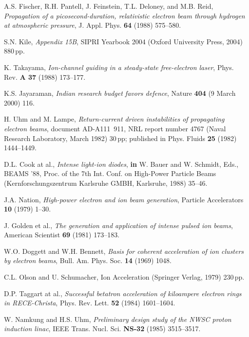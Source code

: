 \documentclass [12pt,a4paper,     ]{report} %
\begin{document}
\begin{enumerate}
 A.S. Fischer, R.H. Pantell, J. Feinstein, T.L. Deloney, and M.B. Reid, \emph{Propagation of a picosecond-duration, relativistic electron beam through hydrogen at atmospheric pressure}, J. Appl. Phys. {\bf 64} (1988) 575--580.

 S.N. Kile, \emph{Appendix 15B}, SIPRI Yearbook 2004 (Oxford University Press, 2004) 880\,pp.

 K. Takayama, \emph{Ion-channel guiding in a steady-state free-electron laser}, Phys. Rev. {\bf A 37} (1988) 173--177.

 K.S. Jayaraman, \emph{Indian research budget favors defence}, Nature {\bf 404} (9 March 2000) 116.

 H. Uhm and M. Lampe, \emph{Return-current driven instabilities of propagating electron beams}, document AD-A111~911, NRL report number 4767 (Naval Research Laboratory, March 1982) 30\,pp; published in Phys. Fluids {\bf 25} (1982) 1444--1449.   %



 D.L. Cook at al., \emph{Intense light-ion diodes}, {\bf in} W. Bauer and W. Schmidt, Eds., BEAMS '88, Proc. of the 7th Int. Conf. on High-Power Particle Beams (Kernforschungszentrum Karlsruhe GMBH, Karlsruhe, 1988) 35--46.

 J.A. Nation, \emph{High-power electron and ion beam generation}, Particle Accelerators {\bf 10} (1979) 1--30.

 J. Golden et al., \emph{The generation and application of intense pulsed ion beams}, American Scientist {\bf 69} (1981) 173--183.

 W.O. Doggett and W.H. Bennett, \emph{Basis for coherent acceleration of ion clusters by electron beams}, Bull. Am. Phys. Soc. {\bf 14} (1969) 1048.

 C.L. Olson and U. Schumacher, Ion Acceleration (Springer Verlag, 1979) 230\,pp.


  D.P. Taggart at al., \emph{Successful betatron acceleration of kiloampere electron rings in RECE-Christa}, Phys. Rev. Lett. {\bf 52} (1984) 1601--1604.

 W. Namkung and H.S. Uhm, \emph{Preliminary design study of the NWSC proton induction linac}, IEEE Trans. Nucl. Sci. {\bf NS-32} (1985) 3515--3517.


\end{enumerate}
\end{document}
